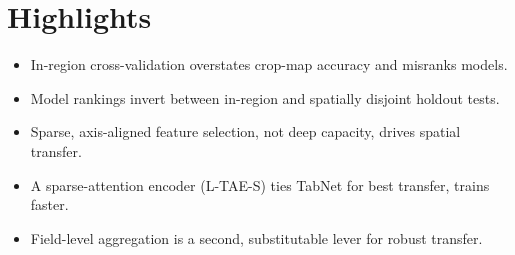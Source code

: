 \documentclass{article}
\begin{document}
\section*{Highlights}
\begin{itemize}[leftmargin=*]
  \item In-region cross-validation overstates crop-map accuracy and misranks models.
  \item Model rankings invert between in-region and spatially disjoint holdout tests.
  \item Sparse, axis-aligned feature selection, not deep capacity, drives spatial transfer.
  \item A sparse-attention encoder (L-TAE-S) ties TabNet for best transfer, trains faster.
  \item Field-level aggregation is a second, substitutable lever for robust transfer.
\end{itemize}
\end{document}
